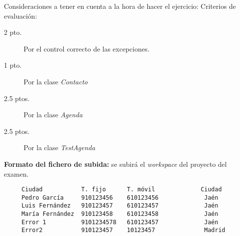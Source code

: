 \documentclass[addpoints,12pt]{exam}
\begin{document}
\begin{questions}
\begin{description}
\begin{itemize}
\end{itemize}
\end{description}
Consideraciones a tener en cuenta a la hora de hacer el ejercicio:
Criterios de evaluación:
\begin{description}
\item[2 pto.] Por el control correcto de las excepciones.
\item[1 pto.] Por la clase \emph{Contacto}
\item[2.5 ptos.] Por la clase \emph{Agenda}
\item[2.5 ptos.] Por la clase \emph{TestAgenda}
\end{description}
\textbf{Formato del fichero de subida:} se subirá el \emph{workspace} del proyecto del examen.
\end{questions}
\begin{verbatim}
     Ciudad           T. fijo      T. móvil             Ciudad
     Pedro García     910123456    610123456             Jaén
     Luis Fernández   910123457    610123457             Jaén
     María Fernández  910123458    610123458             Jaén 
     Error 1          9101234578   610123457             Jaén 
     Error2           910123457    10123457              Madrid
\end{verbatim}
\end{document}
